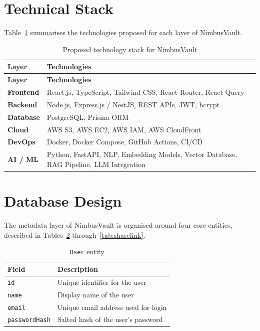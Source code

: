 \documentclass[11pt,a4paper,oneside]{report}
\begin{document}
\section{Technical Stack}

Table~\ref{tab:techstack} summarises the technologies proposed for each layer of NimbusVault.

\begin{longtable}{@{}>{\bfseries}p{3.4cm} p{10.6cm}@{}}
\caption{Proposed technology stack for NimbusVault} \label{tab:techstack} \\
\toprule
\textbf{Layer} & \textbf{Technologies} \\
\midrule
\endfirsthead
\toprule
\textbf{Layer} & \textbf{Technologies} \\
\midrule
\endhead
Frontend & React.js, TypeScript, Tailwind CSS, React Router, React Query \\
\midrule
Backend & Node.js, Express.js / NestJS, REST APIs, JWT, bcrypt \\
\midrule
Database & PostgreSQL, Prisma ORM \\
\midrule
Cloud & AWS S3, AWS EC2, AWS IAM, AWS CloudFront \\
\midrule
DevOps & Docker, Docker Compose, GitHub Actions, CI/CD \\
\midrule
AI / ML & Python, FastAPI, NLP, Embedding Models, Vector Database, RAG Pipeline, LLM Integration \\
\bottomrule
\end{longtable}
\section{Database Design}

The metadata layer of NimbusVault is organised around four core entities, described in Tables~\ref{tab:user} through~\ref{tab:sharelink}.

\begin{table}[h!]
\centering
\begin{tabular}{@{}p{3.2cm}p{9.6cm}@{}}
\toprule
\textbf{Field} & \textbf{Description} \\
\midrule
\texttt{id} & Unique identifier for the user \\
\texttt{name} & Display name of the user \\
\texttt{email} & Unique email address used for login \\
\texttt{passwordHash} & Salted hash of the user's password \\
\bottomrule
\end{tabular}
\caption{\texttt{User} entity}
\label{tab:user}
\end{table}
\end{document}

